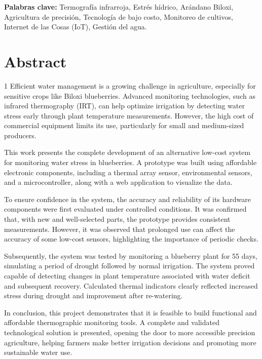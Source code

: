 \documentclass[12pt,openright,oneside]{book}
\begin{document}
\vspace{1cm}

\textbf{Palabras clave:} Termografía infrarroja, Estrés hídrico, Arándano Biloxi, Agricultura de precisión, Tecnología de bajo costo, Monitoreo de cultivos, Internet de las Cosas (IoT), Gestión del agua.

\newpage %

\chapter*{Abstract}
\begin{spacing}{1}
Efficient water management is a growing challenge in agriculture, especially for sensitive crops like Biloxi blueberries. Advanced monitoring technologies, such as infrared thermography (IRT), can help optimize irrigation by detecting water stress early through plant temperature measurements. However, the high cost of commercial equipment limits its use, particularly for small and medium-sized producers.

This work presents the complete development of an alternative low-cost system for monitoring water stress in blueberries. A prototype was built using affordable electronic components, including a thermal array sensor, environmental sensors, and a microcontroller, along with a web application to visualize the data.

To ensure confidence in the system, the accuracy and reliability of its hardware components were first evaluated under controlled conditions. It was confirmed that, with new and well-selected parts, the prototype provides consistent measurements. However, it was observed that prolonged use can affect the accuracy of some low-cost sensors, highlighting the importance of periodic checks.

Subsequently, the system was tested by monitoring a blueberry plant for 55 days, simulating a period of drought followed by normal irrigation. The system proved capable of detecting changes in plant temperature associated with water deficit and subsequent recovery. Calculated thermal indicators clearly reflected increased stress during drought and improvement after re-watering.

In conclusion, this project demonstrates that it is feasible to build functional and affordable thermographic monitoring tools. A complete and validated technological solution is presented, opening the door to more accessible precision agriculture, helping farmers make better irrigation decisions and promoting more sustainable water use.
\end{spacing}
\end{document}
